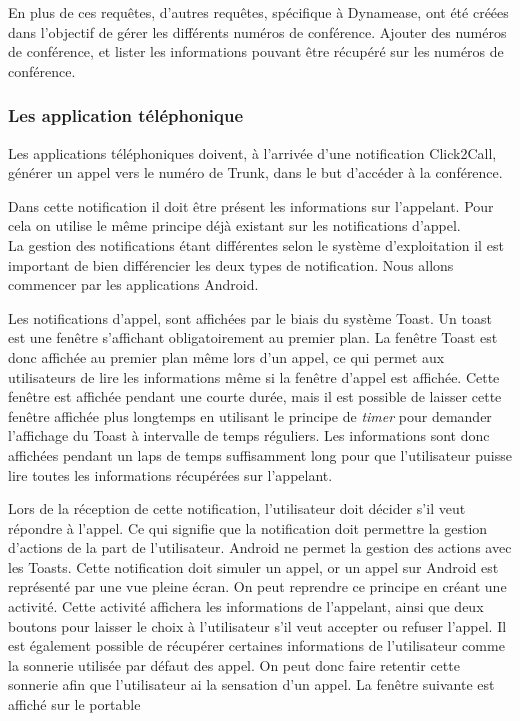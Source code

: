 En plus de ces requêtes, d'autres requêtes, spécifique à Dynamease, ont été créées dans l'objectif de gérer les différents numéros de conférence. Ajouter des numéros de conférence, et lister les informations pouvant être récupéré  sur les numéros de conférence.

\subsubsection{Les application téléphonique} 

Les applications téléphoniques doivent, à l'arrivée d'une notification Click2Call, générer un appel vers le numéro de Trunk, dans le but d'accéder à la conférence.

Dans cette notification il doit être présent les informations sur l'appelant. Pour cela on utilise le même principe déjà existant sur les notifications d'appel.\\

La gestion des notifications étant différentes selon le système d'exploitation il est important de bien différencier les deux types de notification. Nous allons commencer par les applications Android.

Les notifications d'appel, sont affichées par le biais du système Toast. Un toast est une fenêtre s'affichant obligatoirement au premier plan. La fenêtre Toast est donc affichée au premier plan même lors d'un appel, ce qui permet aux utilisateurs de lire les informations même si la fenêtre d'appel est affichée. Cette fenêtre est affichée pendant une courte durée, mais il est possible de laisser cette fenêtre affichée plus longtemps en utilisant le principe de \textit{timer} pour demander l'affichage du Toast à intervalle de temps réguliers. Les informations sont donc affichées pendant un laps de temps suffisamment long pour que l'utilisateur puisse lire toutes les informations récupérées sur l'appelant.

Lors de la réception de cette notification, l'utilisateur doit décider s'il veut répondre à l'appel. Ce qui signifie que la notification doit permettre la gestion d'actions de la part de l'utilisateur. Android ne permet la gestion des actions avec les Toasts. Cette notification doit simuler un appel, or un appel sur Android est représenté par une vue pleine écran. On peut reprendre ce principe en créant une activité. Cette activité affichera les informations de l'appelant, ainsi que deux boutons pour laisser le choix à l'utilisateur s'il veut accepter ou refuser l'appel. Il est également possible de récupérer certaines informations de l'utilisateur comme la sonnerie utilisée par défaut des appel. On peut donc faire retentir cette sonnerie afin que l'utilisateur ai la sensation d'un appel. La fenêtre suivante est affiché sur le portable

